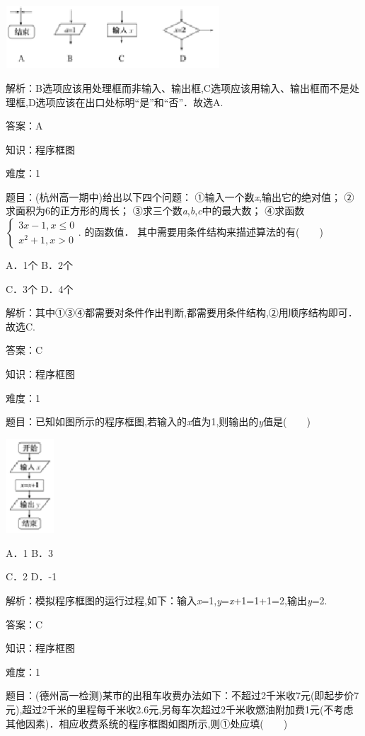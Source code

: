 \documentclass{article} %
\begin{document}
\includegraphics*[width=3.15in, height=0.92in, keepaspectratio=false]{image4}

解析：B选项应该用处理框而非输入、输出框,C选项应该用输入、输出框而不是处理框,D选项应该在出口处标明``是''和``否''．故选A.

答案：A

知识：程序框图

难度：1

题目：(杭州高一期中)给出以下四个问题：
①输入一个数\textit{x},输出它的绝对值；
②求面积为6的正方形的周长；
③求三个数\textit{a},\textit{b},\textit{c}中的最大数；
④求函数$\left\{\begin{array}{l}
3x-1,x\le0\\
x^2+1,x>0
\end{array}\right.$.
的函数值．
其中需要用条件结构来描述算法的有(　　)

A．1个  B．2个

C．3个  D．4个

解析：其中①③④都需要对条件作出判断,都需要用条件结构,②用顺序结构即可．故选C.

答案：C

知识：程序框图

难度：1

题目：已知如图所示的程序框图,若输入的\textit{x}值为1,则输出的\textit{y}值是(　　)

\includegraphics*[width=0.71in, height=1.39in, keepaspectratio=false]{image5}

A．1  B．3

C．2  D．-1

解析：模拟程序框图的运行过程,如下：输入\textit{x}=1,\textit{y}=\textit{x}+1=1+1=2,输出\textit{y}=2.

答案：C

知识：程序框图

难度：1

题目：(德州高一检测)某市的出租车收费办法如下：不超过2千米收7元(即起步价7元),超过2千米的里程每千米收2.6元,另每车次超过2千米收燃油附加费1元(不考虑其他因素)．相应收费系统的程序框图如图所示,则①处应填(　　)
\end{document}
